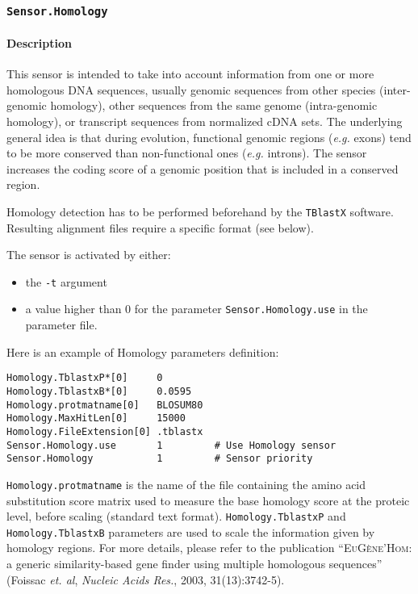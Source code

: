 
\subsubsection{\texttt{Sensor.Homology}}

\paragraph{Description}

This sensor is intended to take into account information from one or
more homologous DNA sequences, usually genomic sequences from other
species (inter-genomic homology), other sequences from the same genome
(intra-genomic homology), or transcript sequences from normalized cDNA
sets. The underlying general idea is that during evolution, functional
genomic regions (\emph{e.g.} exons) tend to be more conserved than
non-functional ones (\emph{e.g.} introns). The sensor increases the
coding score of a genomic position that is included in a conserved
region.

Homology detection has to be performed beforehand by the
\texttt{TBlastX} software. Resulting alignment files require a
specific format (see below).

The sensor is activated by either:
\begin{itemize}
\item the \texttt{-t} argument 
\item a value higher than 0 for the parameter \texttt{Sensor.Homology.use} in the
  parameter file.
\end{itemize}
Here is an example of Homology parameters definition:
\begin{Verbatim}[fontsize=\small]
Homology.TblastxP*[0]     0
Homology.TblastxB*[0]     0.0595
Homology.protmatname[0]   BLOSUM80
Homology.MaxHitLen[0]     15000
Homology.FileExtension[0] .tblastx
Sensor.Homology.use       1         # Use Homology sensor
Sensor.Homology           1         # Sensor priority

\end{Verbatim}

\texttt{Homology.protmatname} is the name of the file containing the
amino acid substitution score matrix used to measure the base homology
score at the proteic level, before scaling (standard text format).
\texttt{Homology.TblastxP} and \texttt{Homology.TblastxB} parameters
are used to scale the information given by homology regions. For more
details, please refer to the publication ``\textsc{EuG\`ene'Hom}: a
generic similarity-based gene finder using multiple homologous
sequences'' (Foissac \emph{et. al}, \emph{Nucleic Acids Res.}, 2003,
31(13):3742-5).

